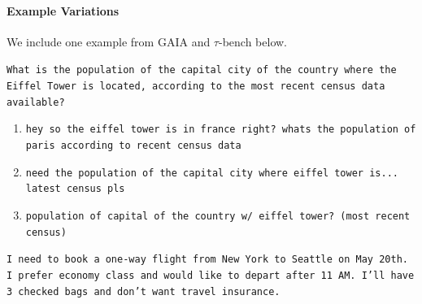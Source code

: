 \documentclass[11pt]{article}
\begin{document}
\paragraph{Example Variations} We include one example from GAIA and $\tau$-bench below.

\begin{tcolorbox}[
    colback=gray!5!white,
    colframe=gray!50!black,
    title={\textbf{Original Prompt}},
    fonttitle=\bfseries\small,
    boxrule=0.5pt,
    arc=2pt
]
\small
\texttt{What is the population of the capital city of the country where the Eiffel Tower is located, according to the most recent census data available?}
\end{tcolorbox}

\vspace{0.5em}
\begin{tcolorbox}[
    colback=gray!5!white,
    colframe=gray!50!black,
    title={\textbf{Naturalistic Variations}},
    fonttitle=\bfseries\small,
    boxrule=0.5pt,
    arc=2pt
]
\small
\begin{enumerate}[leftmargin=*, topsep=2pt, itemsep=2pt]
    \item \texttt{hey so the eiffel tower is in france right? whats the population of paris according to recent census data}
    \item \texttt{need the population of the capital city where eiffel tower is... latest census pls}
    \item \texttt{population of capital of the country w/ eiffel tower? (most recent census)}
\end{enumerate}
\end{tcolorbox}

\begin{tcolorbox}[
    colback=gray!5!white,
    colframe=gray!50!black,
    title={\textbf{Original Instruction (Airline)}},
    fonttitle=\bfseries\small,
    boxrule=0.5pt,
    arc=2pt
]
\small
\texttt{I need to book a one-way flight from New York to Seattle on May 20th. I prefer economy class and would like to depart after 11 AM. I'll have 3 checked bags and don't want travel insurance.}
\end{tcolorbox}
\end{document}
